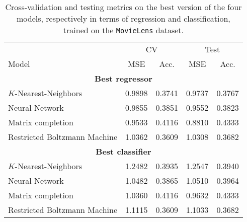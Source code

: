 \begin{table}
\centering
\begin{tabular}{lcccc}
\toprule
	      &  \multicolumn{2}{c}{CV} & \multicolumn{2}{c}{Test} \\
           \cmidrule(lr){2-3}\cmidrule(lr){4-5}
Model	 &  MSE & Acc. & MSE & Acc.  \\
\midrule
\multicolumn{5}{c}{\textbf{Best regressor}}\\
$K$-Nearest-Neighbors 					&   0.9898 &      0.3741 &   0.9737 &        0.3767 \\
Neural Network 							&   0.9855 &      0.3851 &   0.9552 &        0.3823 \\
Matrix completion 						&   0.9533 &      0.4116 &   0.8810 &        0.4333 \\
Restricted Boltzmann Machine 			&   1.0362 &      0.3609 &   1.0308 &        0.3682 \\
\midrule
\multicolumn{5}{c}{\textbf{Best classifier}}\\
$K$-Nearest-Neighbors 					&   1.2482 &      0.3935 &   1.2547 &        0.3940 \\
Neural Network 							&   1.0482 &      0.3865 &   1.0510 &        0.3964 \\
Matrix completion 						&   1.0360 &      0.4116 &   0.9632 &        0.4333 \\
Restricted Boltzmann Machine 			&   1.1115 &      0.3609 &   1.1033 &        0.3682 \\
\bottomrule
\end{tabular}
\caption{Cross-validation and testing metrics on the best version of the four models, respectively in terms of regression and classification, trained on the \texttt{MovieLens} dataset.}
\label{tab:results.model}
\end{table}
